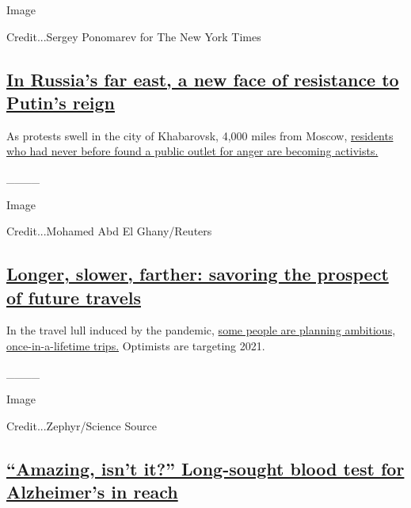 Image

Credit...Sergey Ponomarev for The New York Times

\hypertarget{in-russias-far-east-a-new-face-of-resistance-to-putins-reign}{%
\subsection{\texorpdfstring{\href{https://www.nytimes3xbfgragh.onion/2020/07/28/world/europe/russias-far-east-protests-putin.html}{In
Russia's far east, a new face of resistance to Putin's
reign}}{In Russia's far east, a new face of resistance to Putin's reign}}\label{in-russias-far-east-a-new-face-of-resistance-to-putins-reign}}

As protests swell in the city of Khabarovsk, 4,000 miles from Moscow,
\href{https://www.nytimes3xbfgragh.onion/2020/07/28/world/europe/russias-far-east-protests-putin.html}{residents
who had never before found a public outlet for anger are becoming
activists.}

\_\_\_\_

Image

Credit...Mohamed Abd El Ghany/Reuters

\hypertarget{longer-slower-farther-savoring-the-prospect-of-future-travels}{%
\subsection{\texorpdfstring{\href{https://www.nytimes3xbfgragh.onion/2020/07/28/travel/future-travel-bucket-list-coronavirus.html}{Longer,
slower, farther: savoring the prospect of future
travels}}{Longer, slower, farther: savoring the prospect of future travels}}\label{longer-slower-farther-savoring-the-prospect-of-future-travels}}

In the travel lull induced by the pandemic,
\href{https://www.nytimes3xbfgragh.onion/2020/07/28/travel/future-travel-bucket-list-coronavirus.html}{some
people are planning ambitious, once-in-a-lifetime trips.} Optimists are
targeting 2021.

\_\_\_\_

Image

Credit...Zephyr/Science Source

\hypertarget{amazing-isnt-it-long-sought-blood-test-for-alzheimers-in-reach}{%
\subsection{\texorpdfstring{\href{https://www.nytimes3xbfgragh.onion/2020/07/28/health/alzheimers-blood-test.html}{``Amazing,
isn't it?'' Long-sought blood test for Alzheimer's in
reach}}{``Amazing, isn't it?'' Long-sought blood test for Alzheimer's in reach}}\label{amazing-isnt-it-long-sought-blood-test-for-alzheimers-in-reach}}


